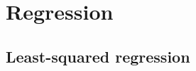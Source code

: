 
\chapter{Regression}
\label{chap:regression}


\section{Least-squared regression}
\label{sec:least-squar-regr}



